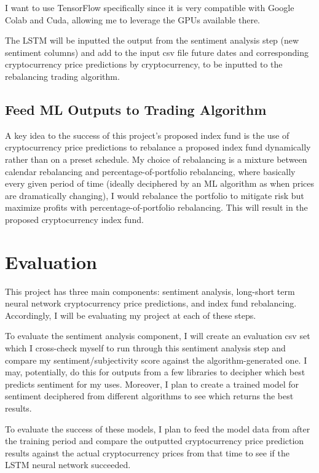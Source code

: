 \documentclass[10pt,twocolumn]{article}
\begin{document}
I want to use TensorFlow specifically since it is very compatible with Google Colab and Cuda, allowing me to leverage the GPUs available there.

The LSTM will be inputted the output from the sentiment analysis step (new sentiment columns) and add to the input csv file future dates and corresponding cryptocurrency price predictions by cryptocurrency, to be inputted to the rebalancing trading algorithm.

\subsection{Feed ML Outputs to Trading Algorithm}

A key idea to the success of this project's proposed index fund is the use of cryptocurrency price predictions to rebalance a proposed index fund dynamically rather than on a preset schedule. My choice of rebalancing is a mixture between calendar rebalancing and percentage-of-portfolio rebalancing, where basically every given period of time (ideally deciphered by an ML algorithm as when prices are dramatically changing), I would rebalance the portfolio to mitigate risk but maximize profits with percentage-of-portfolio rebalancing. This will result in the proposed cryptocurrency index fund.

\section{Evaluation}

This project has three main components: sentiment analysis, long-short term neural network cryptocurrency price predictions, and index fund rebalancing. Accordingly, I will be evaluating my project at each of these steps.

To evaluate the sentiment analysis component, I will create an evaluation csv set which I cross-check myself to run through this sentiment analysis step and compare my sentiment/subjectivity score against the algorithm-generated one. I may, potentially, do this for outputs from a few libraries to decipher which best predicts sentiment for my uses. Moreover, I plan to create a trained model for sentiment deciphered from different algorithms to see which returns the best results.

To evaluate the success of these models, I plan to feed the model data from after the training period and compare the outputted cryptocurrency price prediction results against the actual cryptocurrency prices from that time to see if the LSTM neural network succeeded.
\end{document}
